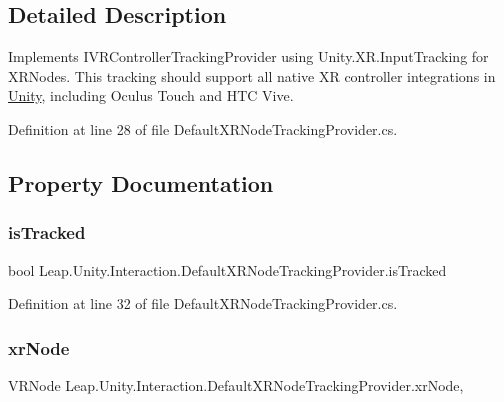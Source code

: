 \subsection{Detailed Description}
Implements I\+V\+R\+Controller\+Tracking\+Provider using Unity.\+X\+R.\+Input\+Tracking for X\+R\+Nodes. This tracking should support all native XR controller integrations in \mbox{\hyperlink{namespace_leap_1_1_unity}{Unity}}, including Oculus Touch and H\+TC Vive. 



Definition at line 28 of file Default\+X\+R\+Node\+Tracking\+Provider.\+cs.



\subsection{Property Documentation}
\mbox{\label{class_leap_1_1_unity_1_1_interaction_1_1_default_x_r_node_tracking_provider_a3c3f8c88548157a2fd99a8beebb8cc4a}} 
\subsubsection{\texorpdfstring{isTracked}{isTracked}}
{\footnotesize\ttfamily bool Leap.\+Unity.\+Interaction.\+Default\+X\+R\+Node\+Tracking\+Provider.\+is\+Tracked\hspace{0.3cm}{\ttfamily [get]}}



Definition at line 32 of file Default\+X\+R\+Node\+Tracking\+Provider.\+cs.

\mbox{\label{class_leap_1_1_unity_1_1_interaction_1_1_default_x_r_node_tracking_provider_a835fe349110d1736872b1df83d0f70bd}} 
\subsubsection{\texorpdfstring{xrNode}{xrNode}}
{\footnotesize\ttfamily V\+R\+Node Leap.\+Unity.\+Interaction.\+Default\+X\+R\+Node\+Tracking\+Provider.\+xr\+Node\hspace{0.3cm}{\ttfamily [get]}, {\ttfamily [set]}}



